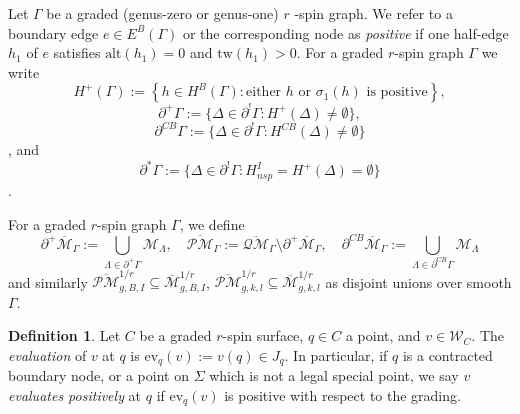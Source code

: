 \documentclass[11pt]{amsart}
\theoremstyle{definition}
\newtheorem{definition}[dummy]{Definition}
\theoremstyle{remark}
\newcommand{\oPM}{{\overline{\mathcal{PM}}}^{1/r}}
\newcommand{\oPMb}{{\overline{\mathcal{PM}}}}
\newcommand{\oQMb}{{\overline{\mathcal{QM}}}}
\newcommand{\<}{\left<}
\renewcommand{\>}{\right>}
\numberwithin{equation}{section}
\def\Mbar{{\overline{\mathcal M}}}
\begin{document}
Let $\Gamma$ be a graded (genus-zero or genus-one) $r$%
-spin graph. We refer %
to a boundary %
edge $e\in E^B(\Gamma)$ or %
the %
corresponding node as %
\textit{positive} if one half-edge $h_1$ of $e$ satisfies ${\text{alt}}(h_1) = 0$ and $\text{tw}(h_1) >0$.  For a graded $r$-spin graph $\Gamma$ we %
write $$H^+(\Gamma):=\left\{h\in H^B(\Gamma)\colon \text{either $h$ or $\sigma_1(h)$ is positive}\right\},$$ 
$$\partial^{+} \Gamma:=\{ {\Delta} \in \partial^{!} \Gamma \colon H^+({\Delta})\ne \emptyset \},$$
$$\partial^{CB} \Gamma:=\{ {\Delta} \in \partial^{!} \Gamma \colon H^{CB}({\Delta})\ne \emptyset \}$$,
and
$$
\partial^* \Gamma:= \{ {\Delta} \in \partial^! \Gamma \colon H^I_{nsp}=H^+({\Delta})= \emptyset \}
$$.


For %
a graded $r$-spin graph $\Gamma$, we define
\[ \partial^+\Mbar_\Gamma:=\bigcup_{\Lambda\in\partial^+\Gamma}{\mathcal{M}}_\Lambda, \quad  \oPMb_\Gamma:= \oQMb_\Gamma\setminus
\partial^+\Mbar_\Gamma,\quad \partial^{CB}\Mbar_\Gamma:=\bigcup_{\Lambda\in\partial^{CB}\Gamma}{\mathcal{M}}_\Lambda\]
and similarly $\oPM_{g,B,I}\subseteq \Mbar^{1/r}_{g,B,I}$, $\oPM_{g,k,l}\subseteq \Mbar^{1/r}_{g,k,l}$ as disjoint unions over smooth $\Gamma$.




\begin{definition}
Let $C$ be a graded $r$-spin surface, $q\in C$ a point, and $v\in{\mathcal{W}}_C$. The \textit{evaluation} of $v$ at $q$ is $\text{ev}_q(v) := v(q) \in J_q$. In particular, if $q$ is a contracted boundary node, or a point on $\Sigma$ which is not a legal special point, we say $v$ \textit{evaluates positively} at $q$ if $\text{ev}_q(v)$ is positive with respect to the grading.
\end{definition}
\end{document}
